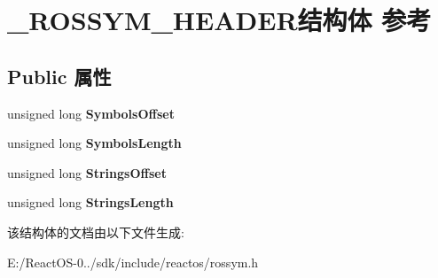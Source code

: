 \hypertarget{struct___r_o_s_s_y_m___h_e_a_d_e_r}{}\section{\+\_\+\+R\+O\+S\+S\+Y\+M\+\_\+\+H\+E\+A\+D\+E\+R结构体 参考}
\label{struct___r_o_s_s_y_m___h_e_a_d_e_r}
\subsection*{Public 属性}
\begin{DoxyCompactItemize}
\item 
\mbox{\label{struct___r_o_s_s_y_m___h_e_a_d_e_r_a6d129504f25a1ee29d1d6bd3ff70f25b}} 
unsigned long {\bfseries Symbols\+Offset}
\item 
\mbox{\label{struct___r_o_s_s_y_m___h_e_a_d_e_r_a977b8cea7cdb83c44a10867aaf02007b}} 
unsigned long {\bfseries Symbols\+Length}
\item 
\mbox{\label{struct___r_o_s_s_y_m___h_e_a_d_e_r_ad5e52fb985ea6a03f99b657fa5a4d771}} 
unsigned long {\bfseries Strings\+Offset}
\item 
\mbox{\label{struct___r_o_s_s_y_m___h_e_a_d_e_r_aabf8787988e1bdf534755696a6646aaf}} 
unsigned long {\bfseries Strings\+Length}
\end{DoxyCompactItemize}


该结构体的文档由以下文件生成\+:\begin{DoxyCompactItemize}
\item 
E\+:/\+React\+O\+S-\/0../sdk/include/reactos/rossym.\+h\end{DoxyCompactItemize}
